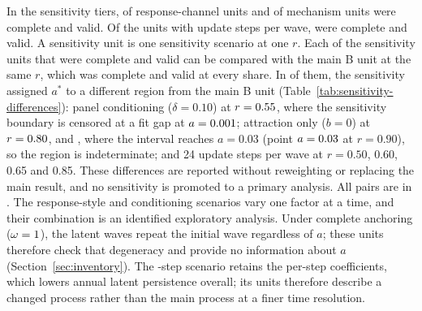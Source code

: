 In the sensitivity tiers,  of  response-channel units and  of  mechanism units were complete and valid. Of the  units with  update steps per wave,  were complete and valid. A sensitivity unit is one sensitivity scenario at one $r$. Each of the  sensitivity units that were complete and valid can be compared with the main B unit at the same $r$, which was complete and valid at every share. In  of them, the sensitivity assigned $a^*$ to a different region from the main B unit (Table~\ref{tab:sensitivity-differences}): panel conditioning ($\delta=0.10$) at $r=\resultnum{j.sensitivity.d010.r055.r}{0.55}$, where the sensitivity boundary is censored at a fit gap at $a=\resultnum{j.sensitivity.d010.r055.sensitivity.gap.0.a}{0.001}$; attraction only ($b=0$) at $r=\resultnum{j.sensitivity.b000.r080.r}{0.80}$,  and , where the interval reaches $a=0.03$ (point $a=\resultnum{j.sensitivity.b000.r090.sensitivity.point}{0.03}$ at $r=0.90$), so the region is indeterminate; and 24 update steps per wave at $r=0.50$, 0.60, 0.65 and 0.85. These differences are reported without reweighting or replacing the main result, and no sensitivity is promoted to a primary analysis. All pairs are in \allunitsresource.
The response-style and conditioning scenarios vary one factor at a time, and their combination is an identified exploratory analysis. Under complete anchoring ($\omega=\resultnum{v4.protocol.omega_full}{1}$), the latent waves repeat the initial wave regardless of $a$; these units therefore check that degeneracy and provide no information about $a$ (Section~\ref{sec:inventory}). The -step scenario retains the per-step coefficients, which lowers annual latent persistence overall; its units therefore describe a changed process rather than the main process at a finer time resolution.




\clearpage
